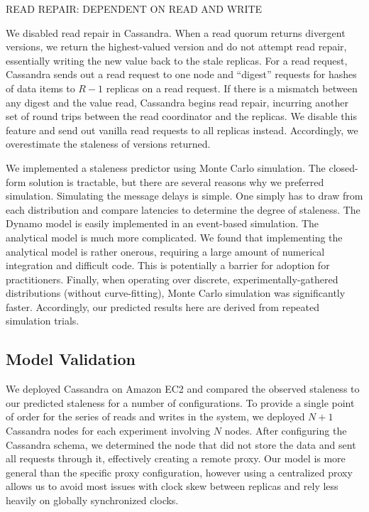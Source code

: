 \documentclass{vldb}
\begin{document}
READ REPAIR: DEPENDENT ON READ AND WRITE

We disabled read repair in Cassandra.  When a read quorum returns
divergent versions, we return the highest-valued version and do not
attempt read repair, essentially writing the new value back to the
stale replicas.  For a read request, Cassandra sends out a read
request to one node and ``digest'' requests for hashes of data items
to $R-1$ replicas on a read request.  If there is a mismatch between
any digest and the value read, Cassandra begins read repair, incurring
another set of round trips between the read coordinator and the
replicas.  We disable this feature and send out vanilla read requests
to all replicas instead.  Accordingly, we overestimate the staleness
of versions returned.

We implemented a staleness predictor using Monte Carlo simulation.
The closed-form solution is tractable, but there are several reasons
why we preferred simulation.  Simulating the message delays is simple.
One simply has to draw from each distribution and compare latencies to
determine the degree of staleness.  The Dynamo model is easily
implemented in an event-based simulation.  The analytical model is
much more complicated.  We found that implementing the analytical
model is rather onerous, requiring a large amount of numerical
integration and difficult code.  This is potentially a barrier for
adoption for practitioners.  Finally, when operating over discrete,
experimentally-gathered distributions (without curve-fitting), Monte
Carlo simulation was significantly faster.  Accordingly, our predicted
results here are derived from repeated simulation trials.

\subsection{Model Validation}

We deployed Cassandra on Amazon EC2 and compared the observed
staleness to our predicted staleness for a number of configurations.
To provide a single point of order for the series of reads and writes
in the system, we deployed $N+1$ Cassandra nodes for each experiment
involving $N$ nodes.  After configuring the Cassandra schema, we
determined the node that did not store the data and sent all requests
through it, effectively creating a remote proxy.  Our model is more
general than the specific proxy configuration, however using a
centralized proxy allows us to avoid most issues with clock skew
between replicas and rely less heavily on globally synchronized
clocks.
\end{document}
